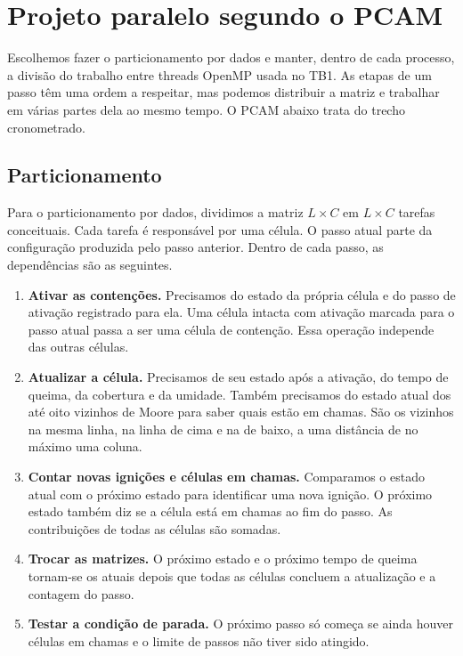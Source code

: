 \documentclass[12pt,a4paper]{article}
\begin{document}
\section{Projeto paralelo segundo o PCAM}

Escolhemos fazer o particionamento por dados e manter, dentro de cada processo, a divisão do trabalho entre threads OpenMP usada no TB1. As etapas de um passo têm uma ordem a respeitar, mas podemos distribuir a matriz e trabalhar em várias partes dela ao mesmo tempo. O PCAM abaixo trata do trecho cronometrado.

\subsection{Particionamento}

Para o particionamento por dados, dividimos a matriz $L \times C$ em $L \times C$ tarefas conceituais. Cada tarefa é responsável por uma célula. O passo atual parte da configuração produzida pelo passo anterior. Dentro de cada passo, as dependências são as seguintes.

\begin{enumerate}
    \item \textbf{Ativar as contenções.} Precisamos do estado da própria célula e do passo de ativação registrado para ela. Uma célula intacta com ativação marcada para o passo atual passa a ser uma célula de contenção. Essa operação independe das outras células.
    \item \textbf{Atualizar a célula.} Precisamos de seu estado após a ativação, do tempo de queima, da cobertura e da umidade. Também precisamos do estado atual dos até oito vizinhos de Moore para saber quais estão em chamas. São os vizinhos na mesma linha, na linha de cima e na de baixo, a uma distância de no máximo uma coluna.
    \item \textbf{Contar novas ignições e células em chamas.} Comparamos o estado atual com o próximo estado para identificar uma nova ignição. O próximo estado também diz se a célula está em chamas ao fim do passo. As contribuições de todas as células são somadas.
    \item \textbf{Trocar as matrizes.} O próximo estado e o próximo tempo de queima tornam-se os atuais depois que todas as células concluem a atualização e a contagem do passo.
    \item \textbf{Testar a condição de parada.} O próximo passo só começa se ainda houver células em chamas e o limite de passos não tiver sido atingido.
\end{enumerate}
\end{document}

